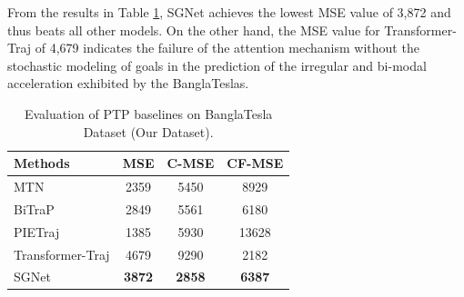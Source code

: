 \documentclass[12pt, a4paper]{article}
\begin{document}
From the results in Table \ref{tab:ptp_bangla}, SGNet achieves the lowest MSE value of 3,872 and thus beats all other models. On the other hand, the MSE value for Transformer-Traj of 4,679 indicates the failure of the attention mechanism without the stochastic modeling of goals in the prediction of the irregular and bi-modal acceleration exhibited by the BanglaTeslas.

\begin{table}[htbp]
\centering
\small 
\setlength{\tabcolsep}{10pt} 
\caption{Evaluation of PTP baselines on BanglaTesla Dataset (Our Dataset).}
\label{tab:ptp_bangla}
\begin{tabular}{lccc}
\toprule
\textbf{Methods} & \textbf{MSE} & \textbf{C-MSE} & \textbf{CF-MSE} \\ 
\midrule
MTN \cite{yin2021multimodal}             & 2359 & 5450  & 8929 \\
BiTraP \cite{yao2021bitrap}              & 2849 & 5561  & 6180 \\
PIETraj \cite{rasouli2019pie}            & 1385 & 5930  & 13628 \\
Transformer-Traj \cite{giuliari2021transformer} & 4679 & 9290 & 2182 \\
SGNet \cite{wang2022stepwise}            & \textbf{3872} & \textbf{2858} & \textbf{6387} \\ 
\bottomrule
\end{tabular}
\end{table}

\end{document}
